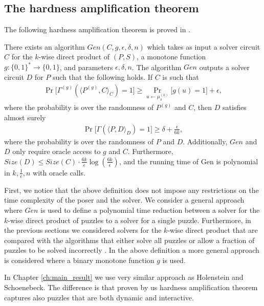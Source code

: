 \subsection{The hardness amplification theorem}
The following hardness amplification theorem is proved in \cite{holenstein2011general}.
\begin{theorem}
There exists an algorithm $\mathit{Gen}(C,g,\epsilon, \delta, n)$ which takes as input a solver circuit $C$ for the $k$-wise
direct product of $(P,S)$, a monotone function $g: \{0,1\}^{*} \rightarrow \{0,1\}$, and parameters $\epsilon,\delta,n$.
The algorithm $\mathit{Gen}$ outputs a solver circuit $D$ for $P$ such that the following holds.
If $C$ is such that
\begin{align*}
\Pr\Big[\Gamma^{(g)}(\langle P^{(g)}, C \rangle_C) = 1\Big] \geq \Pr_{u \leftarrow \mu_{\delta}^{(k)}} \Big[ g(u) = 1 \Big] + \epsilon,
\end{align*}
where the probability is over the randomness of $P^{(g)}$ and $C$, then $D$ satisfies almost surely
\begin{align*}
  \Pr\Big[ \Gamma(\langle P, D\rangle_{D}) = 1\Big] \geq \delta + \frac{\epsilon}{6k},
\end{align*}
where the probability is over the randomness of $P$ and $D$.
Additionally, $\mathit{Gen}$ and $D$ only require oracle access to $g$ and $C$.
Furthermore, $\mathit{Size}(D) \leq \mathit{Size}(C) \cdot \frac{6k}{\epsilon} \log(\frac{6k}{\epsilon})$,
and the running time of Gen is polynomial in $k, \frac{1}{\epsilon}, n$ with oracle calls.
\end{theorem}

First, we notice that the above definition does not impose any restrictions on the time complexity of the poser and the solver.
We consider a general approach where $\mathit{Gen}$ is used to define a polynomial time reduction between a solver for the $k$-wise
direct product of puzzles to a solver for a single puzzle.
Furthermore, in the previous sections we considered solvers for the $k$-wise direct product that are compared with the algorithms that either
solve all puzzles \cite{canetti2005hardness} or allow a fraction of puzzles to be solved incorrectly \cite{dodis2009security}.
In the above definition a more general approach is considered where a binary monotone function $g$ is used.

In Chapter \ref{ch:main_result} we use very similar approach as Holenstein and Schoenebeck.
The difference is that proven by us hardness amplification theorem captures also puzzles that are both dynamic and interactive.

